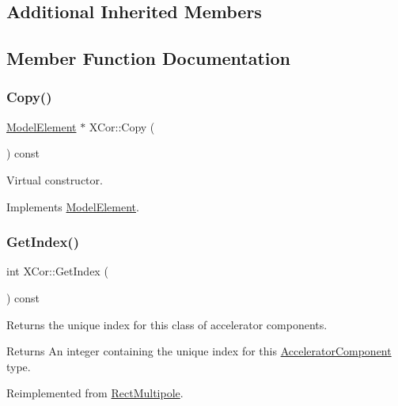 \subsection*{Additional Inherited Members}


\subsection{Member Function Documentation}
\mbox{\label{classXCor_a8c84be893f565bd2dac6cf24da38873f}} 
\subsubsection{\texorpdfstring{Copy()}{Copy()}}
{\footnotesize\ttfamily \hyperlink{classModelElement}{Model\+Element} $\ast$ X\+Cor\+::\+Copy (\begin{DoxyParamCaption}{ }\end{DoxyParamCaption}) const\hspace{0.3cm}{\ttfamily [virtual]}}

Virtual constructor. 

Implements \hyperlink{classModelElement_ac3ca26d649bd86a0f31a58ae09941429}{Model\+Element}.

\mbox{\label{classXCor_abc1f1ab53804904384d6fadfcbaba5bb}} 
\subsubsection{\texorpdfstring{Get\+Index()}{GetIndex()}}
{\footnotesize\ttfamily int X\+Cor\+::\+Get\+Index (\begin{DoxyParamCaption}{ }\end{DoxyParamCaption}) const\hspace{0.3cm}{\ttfamily [virtual]}}

Returns the unique index for this class of accelerator components. \begin{DoxyReturn}{Returns}
An integer containing the unique index for this \hyperlink{classAcceleratorComponent}{Accelerator\+Component} type. 
\end{DoxyReturn}


Reimplemented from \hyperlink{classRectMultipole_a9bc789b2a193e341aab8bbd47a0e3ad4}{Rect\+Multipole}.

